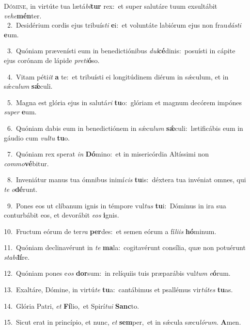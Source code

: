 \lettrine{\initial\textcolor{\initialcolor}{D}}{ómine,} in virtúte tua lætá\-\textit{bi}\-\textbf{tur} rex:~\star et super salutáre tuum exsultábit \textit{ve}\-\textit{he}\textbf{mén}ter.\\
{\numbfont\textcolor{\numbcolor}{~2.}}~Desidérium cordis ejus tribuís\textit{ti} \textbf{e}\-i:~\star et voluntáte labiórum ejus non frau\-\textit{dás}\-\textit{ti} \textbf{e}\-um.\par
{\numbfont\textcolor{\numbcolor}{~3.}}~Quóniam prævenísti eum in benedictiónibus \textit{dul}\-\textbf{cé}dinis:~\star posuísti in cápite ejus corónam de lápide \textit{pre}\-\textit{ti}\textbf{ó}so.\par
{\numbfont\textcolor{\numbcolor}{~4.}}~Vitam péti\textit{it} \textbf{a} te:~\star et tribuísti ei longitúdinem diérum in sǽculum, et in sǽ\-\textit{cu}\-\textit{lum} \textbf{sǽ}\-culi.\par
{\numbfont\textcolor{\numbcolor}{~5.}}~Magna est glória ejus in salutá\textit{ri} \textbf{tu}\-o:~\star glóriam et magnum decórem impónes \textit{su}\-\textit{per} \textbf{e}\-um.\par
{\numbfont\textcolor{\numbcolor}{~6.}}~Quóniam dabis eum in benedictiónem in sǽcu\textit{lum} \textbf{sǽ}\-culi:~\star lætificábis eum in gáudio cum \textit{vul}\-\textit{tu} \textbf{tu}\-o.\par
{\numbfont\textcolor{\numbcolor}{~7.}}~Quóniam rex sperat \textit{in} \textbf{Dó}\-mino:~\star et in misericórdia Altíssimi non \textit{com}\-\textit{mo}\textbf{vé}bitur.\par
{\numbfont\textcolor{\numbcolor}{~8.}}~Inveniátur manus tua ómnibus inimí\textit{cis} \textbf{tu}\-is:~\star déxtera tua invéniat omnes, qui \textit{te} \textit{o}\-\textbf{dé}runt.\par
{\numbfont\textcolor{\numbcolor}{~9.}}~Pones eos ut clíbanum ignis in témpore vul\textit{tus} \textbf{tu}\-i:~\star Dóminus in ira sua conturbábit eos, et devorábit \textit{e}\-\textit{os} \textbf{i}\-gnis.\par
{\numbfont\textcolor{\numbcolor}{10.}}~Fructum eórum de ter\textit{ra} \textbf{per}\-des:~\star et semen eórum a fí\-\textit{li}\-\textit{is} \textbf{hó}\-minum.\par
{\numbfont\textcolor{\numbcolor}{11.}}~Quóniam declinavérunt in \textit{te} \textbf{ma}\-la:~\star cogitavérunt consília, quæ non potuérunt \textit{sta}\-\textit{bi}\textbf{lí}re.\par
{\numbfont\textcolor{\numbcolor}{12.}}~Quóniam pones e\textit{os} \textbf{dor}\-sum:~\star in relíquiis tuis præparábis vul\textit{tum} \textit{e}\-\textbf{ó}rum.\par
{\numbfont\textcolor{\numbcolor}{13.}}~Exaltáre, Dómine, in virtú\textit{te} \textbf{tu}\-a:~\star cantábimus et psallémus vir\-\textit{tú}\-\textit{tes} \textbf{tu}\-as.\par
{\numbfont\textcolor{\numbcolor}{14.}}~Glória Patri, \textit{et} \textbf{Fí}\-lio,~\star et Spirí\-\textit{tu}\-\textit{i} \textbf{Sanc}\-to.\par
{\numbfont\textcolor{\numbcolor}{15.}}~Sicut erat in princípio, et nunc, \textit{et} \textbf{sem}\-per,~\star et in sǽcula sæcu\-\textit{ló}\-\textit{rum}. \textbf{A}\-men.\par
